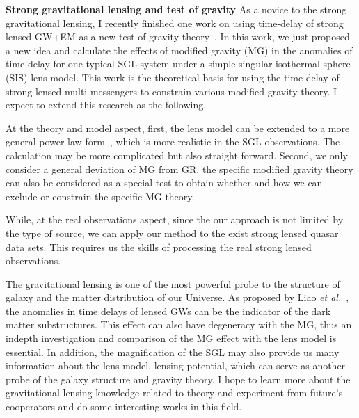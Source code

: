 \documentclass[11pt,letterpaper,sans]{moderncv}   %
\begin{document}
\vspace{2mm}
\noindent
\textcolor{color1}{\textbf{Strong gravitational lensing and test of gravity}}
As a novice to the strong gravitational lensing, I recently finished one work on using time-delay of strong lensed GW+EM as a new test of gravity theory~\cite{Yang:2018bdf}.
In this work, we just proposed a new idea and calculate the effects of modified gravity (MG) in the anomalies of time-delay for one typical SGL system under a simple singular isothermal sphere (SIS) lens model. This work is the theoretical basis  for using the time-delay of strong lensed multi-messengers to constrain various modified gravity theory. I expect to extend this research as the following.

\vspace{2mm}
\noindent
At the theory and model aspect, first, the lens model can be extended to a more general power-law form~\cite{Holanda:2017jrj}, which is  more realistic in the SGL observations. The calculation may be more complicated but also straight forward. Second, we only consider a general deviation of MG from GR, the specific modified gravity theory can also be considered as a special test to obtain whether and how we can exclude or constrain the specific MG theory.

\vspace{2mm}
\noindent
While, at the real observations aspect, since the our approach is not limited by the type of source, we can apply our method to the exist strong lensed quasar data sets.  This requires us the skills of processing the real strong lensed observations.

\vspace{2mm}
\noindent
The gravitational lensing is one of the most powerful probe to the structure of galaxy and the matter distribution of our Universe. As proposed by Liao \textit{et al.}~\cite{Liao:2018ofi}, the anomalies in time delays of lensed GWs can be the indicator of the dark matter substructures. This effect can also have  degeneracy with the MG, thus an indepth investigation and comparison of the MG effect with the lens model is essential. In addition, the magnification of the SGL may also provide us many information about the lens model, lensing potential, which can serve as another probe of the galaxy structure and gravity theory. I hope to learn more about the gravitational lensing knowledge related to theory and experiment from future's cooperators and do some interesting works in this field. 

















\end{document}
